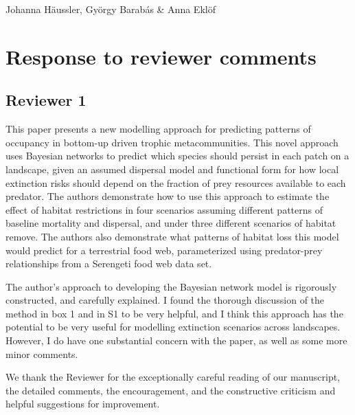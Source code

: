 \documentclass[11pt]{article}
\newcommand{\us}{\rm \setlength{\leftskip}{0.3cm} \setlength{\rightskip}{0.3cm}}
\newcommand{\them}{\it \setlength{\leftskip}{0cm} \setlength{\rightskip}{0cm}}
\begin{document}
Johanna H\"aussler, Gy\"orgy Barab\'as \& Anna Eklöf

\newpage


\section*{Response to reviewer comments}

\subsection*{Reviewer 1}

\them

This paper presents a new modelling approach for predicting patterns of occupancy in bottom-up driven trophic metacommunities. This novel approach uses Bayesian networks to predict which species should persist in each patch on a landscape, given an assumed dispersal model and functional form for how local extinction risks should depend on the fraction of prey resources available to each predator. The authors demonstrate how to use this approach to estimate the effect of habitat restrictions in four scenarios assuming different patterns of baseline mortality and dispersal, and under three different scenarios of habitat remove. The authors also demonstrate what patterns of habitat loss this model would predict for a terrestrial food web, parameterized using predator-prey relationships from a Serengeti food web data set.

The author's approach to developing the Bayesian network model is rigorously constructed, and carefully explained. I found the thorough discussion of the method in box 1 and in S1 to be very helpful, and I think this approach has the potential to be very useful for modelling extinction scenarios across landscapes. However, I do have one substantial concern with the paper, as well as some more minor comments.

\us

We thank the Reviewer for the exceptionally careful reading of our manuscript, the detailed comments, the encouragement, and the constructive criticism and helpful suggestions for improvement.

\them
\end{document}
